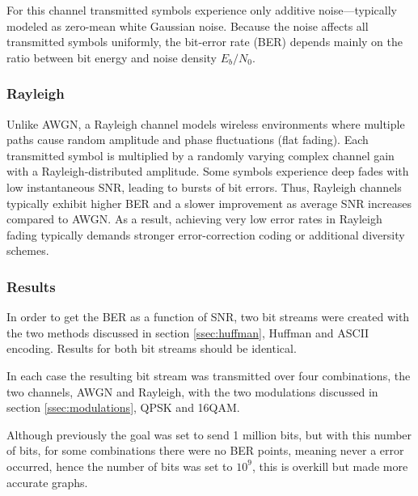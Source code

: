 For this channel transmitted symbols experience only additive noise—typically modeled as zero-mean white Gaussian noise. Because the noise affects all transmitted symbols uniformly, the bit-error rate (BER) depends mainly on the ratio between bit energy and noise density $E_b/N_{0}$. 

\subsubsection{Rayleigh}

Unlike AWGN, a Rayleigh channel models wireless environments where multiple paths cause random amplitude and phase fluctuations (flat fading). Each transmitted symbol is multiplied by a randomly varying complex channel gain with a Rayleigh-distributed amplitude. Some symbols experience deep fades with low instantaneous SNR, leading to bursts of bit errors. Thus, Rayleigh channels typically exhibit higher BER and a slower improvement as average SNR increases compared to AWGN. As a result, achieving very low error rates in Rayleigh fading typically demands stronger error-correction coding or additional diversity schemes.

\subsubsection{Results}
\label{sec:channel_results}

In order to get the BER as a function of SNR, two bit streams were created with the two methods discussed in section \ref{ssec:huffman}, Huffman and ASCII encoding. Results for both bit streams should be identical. 

In each case the resulting bit stream was transmitted over four combinations, the two channels, AWGN and Rayleigh, with the two modulations discussed in section \ref{ssec:modulations}, QPSK and 16QAM.

Although previously the goal was set to send 1 million bits, but with this number of bits, for some combinations there were no BER points, meaning never a error occurred, hence the number of bits was set to $10^{9}$, this is overkill but made more accurate graphs. 


